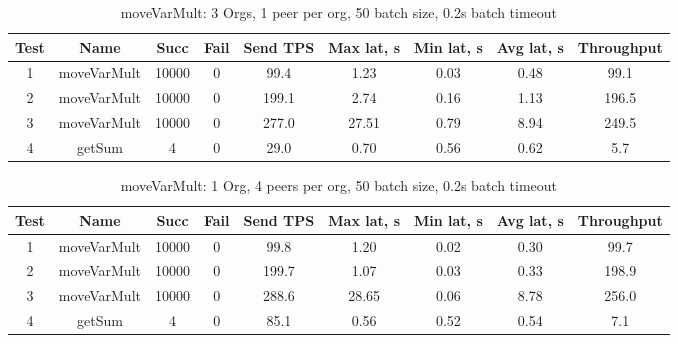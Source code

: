 \begin{appendices}
\begin{table}[H]
\begin{center}
\begin{tabular}{ |c|c|c|c|c|c|c|c|c| }
 \hline
  Test & Name & Succ  & Fail & Send TPS & Max lat, s & Min lat, s & Avg lat, s & Throughput \\
 \hline
 \hline
 1    & moveVarMult & 10000 & 0    & 99.4  & 1.23      & 0.03      & 0.48      & 99.1   \\
 \hline
 2    & moveVarMult & 10000 & 0    & 199.1 & 2.74      & 0.16      & 1.13      & 196.5  \\
 \hline
 3    & moveVarMult & 10000 & 0    & 277.0 & 27.51     & 0.79      & 8.94      & 249.5  \\
 \hline
 4    & getSum      & 4     & 0    & 29.0  & 0.70      & 0.56      & 0.62      & 5.7    \\
 \hline
\end{tabular}
\end{center}
\caption{moveVarMult: 3 Orgs, 1 peer per org, 50 batch size, 0.2s batch timeout}
\end{table}

\begin{table}[H]
\begin{center}
\begin{tabular}{ |c|c|c|c|c|c|c|c|c| }
 \hline
  Test & Name & Succ  & Fail & Send TPS & Max lat, s & Min lat, s & Avg lat, s & Throughput \\
 \hline
 \hline
 1    & moveVarMult & 10000 & 0    & 99.8  & 1.20      & 0.02      & 0.30      & 99.7   \\
 \hline
 2    & moveVarMult & 10000 & 0    & 199.7 & 1.07      & 0.03      & 0.33      & 198.9  \\
 \hline
 3    & moveVarMult & 10000 & 0    & 288.6 & 28.65     & 0.06      & 8.78      & 256.0  \\
 \hline
 4    & getSum      & 4     & 0    & 85.1  & 0.56      & 0.52      & 0.54      & 7.1    \\
 \hline
\end{tabular}
\end{center}
\caption{moveVarMult: 1 Org, 4 peers per org, 50 batch size, 0.2s batch timeout}
\end{table}


\end{appendices}
